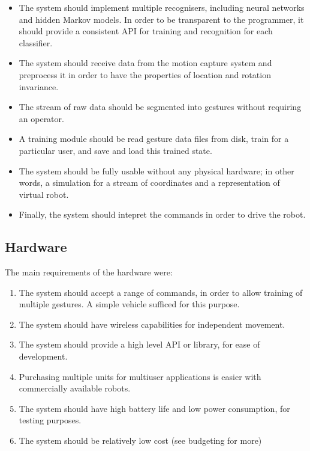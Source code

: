 \documentclass[12pt,a4,notitlepage]{report}
\renewcommand{\_}{\texttt{\symbol{95}}}
\newcommand{\<}{\texttt{\symbol{60}}}
\renewcommand{\>}{\texttt{\symbol{62}}}
\begin{document}
\begin{itemize}
\item The system should implement multiple recognisers, including neural networks and hidden Markov models. In order to be transparent to the programmer, it should provide a consistent API for training and recognition for each classifier.
\item The system should receive data from the motion capture system and preprocess it in order to have the properties of location and rotation invariance.
\item The stream of raw data should be segmented into gestures without requiring an operator.
\item A training module should be read gesture data files from disk, train for a particular user, and save and load this trained state.
\item The system should be fully usable without any physical hardware; in other words, a simulation for a stream of coordinates and a representation of virtual robot.
\item Finally, the system should intepret the commands in order to drive the robot.
\end{itemize}

\subsection{Hardware}

The main requirements of the hardware were:

\begin{enumerate}
\item The system should accept a range of commands, in order to allow training of multiple gestures. A simple vehicle sufficed for this purpose.
\item The system should have wireless capabilities for independent movement.
\item The system should provide a high level API or library, for ease of development.
\item Purchasing multiple units for multiuser applications is easier with commercially available robots.
\item The system should have high battery life and low power consumption, for testing purposes.
\item The system should be relatively low cost (see budgeting for more)
\end{enumerate}
\end{document}
